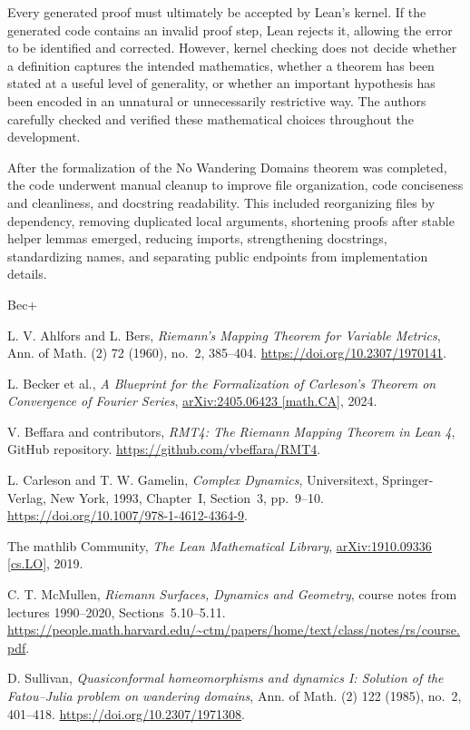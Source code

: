 \documentclass[letterpaper]{amsart}
\numberwithin{equation}{section}
\numberwithin{figure}{section}
\theoremstyle{plain}
\theoremstyle{definition}
\begin{document}
Every generated proof must ultimately be accepted by Lean's kernel. If the generated code contains an invalid proof step, Lean rejects it, allowing the error to be identified and corrected. However, kernel checking does not decide whether a definition captures the intended mathematics, whether a theorem has been stated at a useful level of generality, or whether an important hypothesis has been encoded in an unnatural or unnecessarily restrictive way. The authors carefully checked and verified these mathematical choices throughout the development.

After the formalization of the No Wandering Domains theorem was completed, the code underwent manual cleanup to improve file organization, code conciseness and cleanliness, and docstring readability. This included reorganizing files by dependency, removing duplicated local arguments, shortening proofs after stable helper lemmas emerged, reducing imports, strengthening docstrings, standardizing names, and separating public endpoints from implementation details.

\begin{thebibliography}{Bec+}

L. V. Ahlfors and L. Bers, \emph{Riemann's Mapping Theorem for Variable Metrics}, Ann. of Math. (2) 72 (1960), no.~2, 385--404. \url{https://doi.org/10.2307/1970141}.

L. Becker et al., \emph{A Blueprint for the Formalization of Carleson's Theorem on Convergence of Fourier Series}, \href{https://arxiv.org/abs/2405.06423}{arXiv:2405.06423 [math.CA]}, 2024.

V. Beffara and contributors, \emph{RMT4: The Riemann Mapping Theorem in Lean 4}, GitHub repository. \url{https://github.com/vbeffara/RMT4}.

L. Carleson and T. W. Gamelin, \emph{Complex Dynamics}, Universitext, Springer-Verlag, New York, 1993, Chapter~I, Section~3, pp.~9--10. \url{https://doi.org/10.1007/978-1-4612-4364-9}.

The mathlib Community, \emph{The Lean Mathematical Library}, \href{https://arxiv.org/abs/1910.09336}{arXiv:1910.09336 [cs.LO]}, 2019.

C. T. McMullen, \emph{Riemann Surfaces, Dynamics and Geometry}, course notes from lectures 1990--2020, Sections~5.10--5.11. \url{https://people.math.harvard.edu/~ctm/papers/home/text/class/notes/rs/course.pdf}.

D. Sullivan, \emph{Quasiconformal homeomorphisms and dynamics I: Solution of the Fatou--Julia problem on wandering domains}, Ann. of Math. (2) 122 (1985), no.~2, 401--418. \url{https://doi.org/10.2307/1971308}.

\end{thebibliography}
\end{document}
